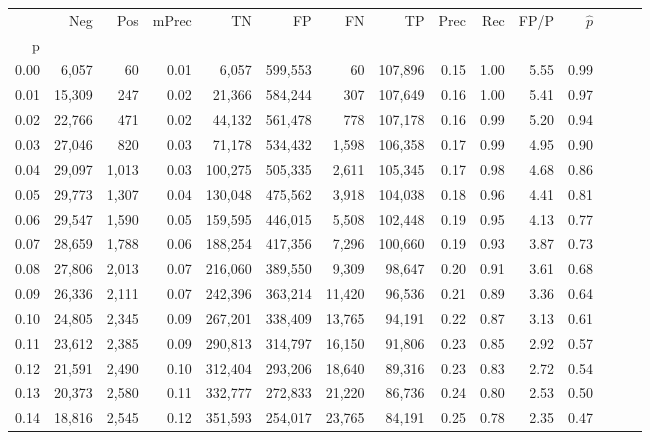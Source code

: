 \begin{tabular}{rrrrrrrrrrrrrrr}
\toprule
{} &     Neg &    Pos & mPrec &       TN &       FP &       FN &       TP &  Prec &   Rec &  FP/P & $\hat{p}$ \\
p    &         &        &       &          &          &          &          &       &       &       &           \\
\midrule
0.00 &   6,057 &     60 &  0.01 &    6,057 &  599,553 &       60 &  107,896 &  0.15 &  1.00 &  5.55 &      0.99 \\
0.01 &  15,309 &    247 &  0.02 &   21,366 &  584,244 &      307 &  107,649 &  0.16 &  1.00 &  5.41 &      0.97 \\
0.02 &  22,766 &    471 &  0.02 &   44,132 &  561,478 &      778 &  107,178 &  0.16 &  0.99 &  5.20 &      0.94 \\
0.03 &  27,046 &    820 &  0.03 &   71,178 &  534,432 &    1,598 &  106,358 &  0.17 &  0.99 &  4.95 &      0.90 \\
0.04 &  29,097 &  1,013 &  0.03 &  100,275 &  505,335 &    2,611 &  105,345 &  0.17 &  0.98 &  4.68 &      0.86 \\
0.05 &  29,773 &  1,307 &  0.04 &  130,048 &  475,562 &    3,918 &  104,038 &  0.18 &  0.96 &  4.41 &      0.81 \\
0.06 &  29,547 &  1,590 &  0.05 &  159,595 &  446,015 &    5,508 &  102,448 &  0.19 &  0.95 &  4.13 &      0.77 \\
0.07 &  28,659 &  1,788 &  0.06 &  188,254 &  417,356 &    7,296 &  100,660 &  0.19 &  0.93 &  3.87 &      0.73 \\
0.08 &  27,806 &  2,013 &  0.07 &  216,060 &  389,550 &    9,309 &   98,647 &  0.20 &  0.91 &  3.61 &      0.68 \\
0.09 &  26,336 &  2,111 &  0.07 &  242,396 &  363,214 &   11,420 &   96,536 &  0.21 &  0.89 &  3.36 &      0.64 \\
0.10 &  24,805 &  2,345 &  0.09 &  267,201 &  338,409 &   13,765 &   94,191 &  0.22 &  0.87 &  3.13 &      0.61 \\
0.11 &  23,612 &  2,385 &  0.09 &  290,813 &  314,797 &   16,150 &   91,806 &  0.23 &  0.85 &  2.92 &      0.57 \\
0.12 &  21,591 &  2,490 &  0.10 &  312,404 &  293,206 &   18,640 &   89,316 &  0.23 &  0.83 &  2.72 &      0.54 \\
0.13 &  20,373 &  2,580 &  0.11 &  332,777 &  272,833 &   21,220 &   86,736 &  0.24 &  0.80 &  2.53 &      0.50 \\
0.14 &  18,816 &  2,545 &  0.12 &  351,593 &  254,017 &   23,765 &   84,191 &  0.25 &  0.78 &  2.35 &      0.47 \\

\end{tabular}
